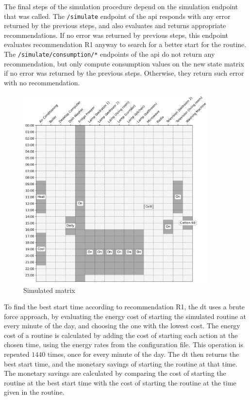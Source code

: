 The final steps of the simulation procedure depend on the simulation endpoint that was called. The \texttt{/simulate} endpoint of the \acrshort{api} responds with any error returned by the previous steps, and also evaluates and returns appropriate recommendations. If no error was returned by previous steps, this endpoint evaluates recommendation R1 anyway to search for a better start for the routine. The \texttt{/simulate/consumption/*} endpoints of the \acrshort{api} do not return any recommendation, but only compute consumption values on the new state matrix if no error was returned by the previous steps. Otherwise, they return such error with no recommendation. 

\begin{figure}
    \centering
    \includegraphics[width=0.9\textwidth]{images/simulated_matrix.png}
    \caption{Simulated matrix}%
    \label{fig:simulated_consumption_matrix}
\end{figure}

To find the best start time according to recommendation R1, the \acrshort{dt} uses a brute force approach, by evaluating the energy cost of starting the simulated routine at every minute of the day, and choosing the one with the lowest cost. The energy cost of a routine is calculated by adding the cost of starting each action at the chosen time, using the energy rates from the configuration file. This operation is repeated \(1440\) times, once for every minute of the day. The \acrshort{dt} then returns the best start time, and the monetary savings of starting the routine at that time. The monetary savings are calculated by comparing the cost of starting the routine at the best start time with the cost of starting the routine at the time given in the routine.

